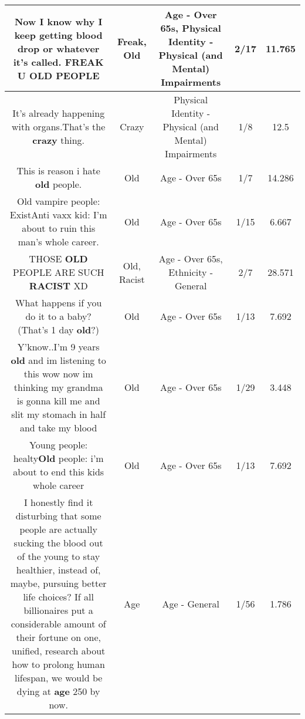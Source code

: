 \documentclass[11pt]{article}
\newlength\mylength
\begin{document}
\begin{center}
\begin{longtable}{|C{.65\mylength}|C{.30\mylength}|C{.12\mylength}|C{.12\mylength}|C{.12\mylength}|}
  \small Now I know why I keep getting blood drop or whatever it's called. \textbf{FREAK} U \textbf{OLD} PEOPLE\normalsize   & Freak, Old & Age - Over 65s, Physical Identity - Physical (and Mental) Impairments & 2/17 & 11.765 \\  \hline
  \small It's already happening with organs.That's the \textbf{crazy} thing.\normalsize   & Crazy & Physical Identity - Physical (and Mental) Impairments & 1/8 & 12.5 \\  \hline
  \small This is reason i hate \textbf{old} people.\normalsize   & Old & Age - Over 65s & 1/7 & 14.286 \\  \hline
  \small Old vampire people: ExistAnti vaxx kid: I'm about to ruin this man's whole career.\normalsize   & Old & Age - Over 65s & 1/15 & 6.667 \\  \hline
  \small THOSE \textbf{OLD} PEOPLE ARE SUCH \textbf{RACIST} XD\normalsize   & Old, Racist & Age - Over 65s, Ethnicity - General & 2/7 & 28.571 \\  \hline
  \small What happens if you do it to a baby? (That's 1 day \textbf{old}?)\normalsize   & Old & Age - Over 65s & 1/13 & 7.692 \\  \hline
  \small Y'know..I'm 9 years \textbf{old} and im listening to this wow now im thinking my grandma is gonna kill me and slit my stomach in half and take my blood\normalsize   & Old & Age - Over 65s & 1/29 & 3.448 \\  \hline
  \small Young people:  healty\textbf{Old} people:  i'm about to end this kids whole career\normalsize   & Old & Age - Over 65s & 1/13 & 7.692 \\  \hline
  \small I honestly find it disturbing that some people are actually sucking the blood out of the young to stay healthier, instead of, maybe, pursuing better life choices? If all billionaires put a considerable amount of their fortune on one, unified, research about how to prolong human lifespan, we would be dying at \textbf{age} 250 by now.\normalsize   & Age & Age - General & 1/56 & 1.786 \\  \hline

\end{longtable}
\end{center}
\end{document}

